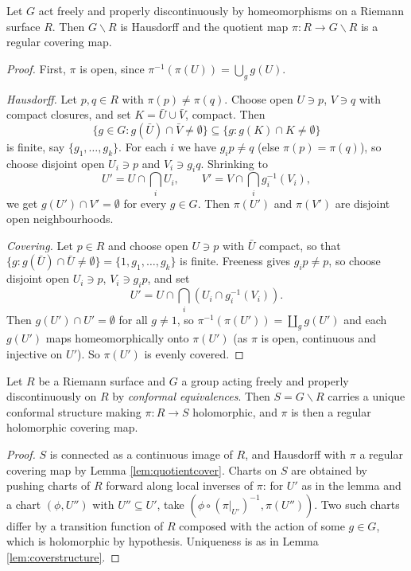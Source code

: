 \documentclass[a4paper]{scrartcl}
\begin{document}
\begin{lemma}\label{lem:quotientcover}
	Let $G$ act freely and properly discontinuously by homeomorphisms on a Riemann surface
	$R$. Then $G\backslash R$ is Hausdorff and the quotient map $\pi : R \to G\backslash R$
	is a regular covering map.
\end{lemma}

\begin{proof}
	First, $\pi$ is open, since $\pi^{-1}(\pi(U)) = \bigcup_{g} g(U)$.

	\emph{Hausdorff.} Let $p, q \in R$ with $\pi(p)\neq\pi(q)$. Choose open $U\ni p$,
	$V\ni q$ with compact closures, and set $K = \bar U\cup\bar V$, compact. Then
	$$
	\{g \in G : g(\bar U)\cap \bar V \neq \emptyset\} \subseteq \{g : g(K)\cap K \neq\emptyset\}
	$$
	is finite, say $\{g_1,\dots,g_k\}$. For each $i$ we have $g_i p \neq q$ (else
	$\pi(p)=\pi(q)$), so choose disjoint open $U_i \ni p$ and $V_i \ni g_i q$. Shrinking to
	$$
	U' = U \cap \bigcap_i U_i, \qquad V' = V\cap\bigcap_i g_i^{-1}(V_i),
	$$
	we get $g(U')\cap V' = \emptyset$ for every $g \in G$. Then $\pi(U')$ and $\pi(V')$ are
	disjoint open neighbourhoods.

	\emph{Covering.} Let $p \in R$ and choose open $U\ni p$ with $\bar U$ compact, so that
	$\{g : g(\bar U)\cap\bar U\neq\emptyset\} = \{1, g_1,\dots,g_k\}$ is finite. Freeness
	gives $g_ip\neq p$, so choose disjoint open $U_i\ni p$, $V_i \ni g_ip$, and set
	$$
	U' = U\cap\bigcap_i\left(U_i \cap g_i^{-1}(V_i)\right).
	$$
	Then $g(U')\cap U' = \emptyset$ for all $g \neq 1$, so $\pi^{-1}(\pi(U')) =
	\coprod_g g(U')$ and each $g(U')$ maps homeomorphically onto $\pi(U')$ (as $\pi$ is
	open, continuous and injective on $U'$). So $\pi(U')$ is evenly covered.
\end{proof}

\begin{proposition}\label{prop:quotientRS}
	Let $R$ be a Riemann surface and $G$ a group acting freely and properly discontinuously
	on $R$ by \emph{conformal equivalences}. Then $S = G\backslash R$ carries a unique
	conformal structure making $\pi : R \to S$ holomorphic, and $\pi$ is then a regular
	holomorphic covering map.
\end{proposition}

\begin{proof}
	$S$ is connected as a continuous image of $R$, and Hausdorff with $\pi$ a regular
	covering map by Lemma \ref{lem:quotientcover}. Charts on $S$ are obtained by pushing
	charts of $R$ forward along local inverses of $\pi$: for $U'$ as in the lemma and a
	chart $(\phi, U'')$ with $U''\subseteq U'$, take $(\phi\circ(\pi|_{U'})^{-1}, \pi(U''))$.
	Two such charts differ by a transition function of $R$ composed with the action of some
	$g\in G$, which is holomorphic by hypothesis. Uniqueness is as in Lemma
	\ref{lem:coverstructure}.
\end{proof}
\end{document}
